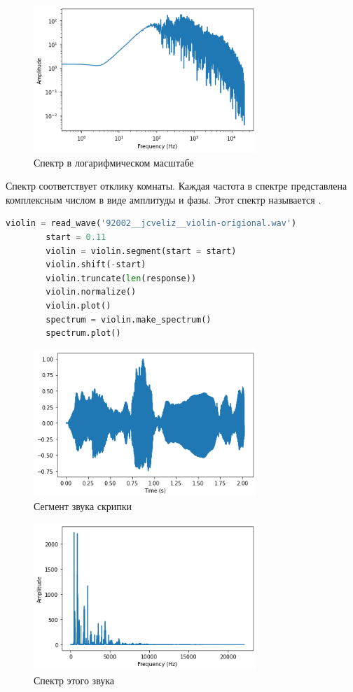 \documentclass[a4paper, 12pt]{report}
\begin{document}
	\begin{figure}[H]
		\centering
		\includegraphics[width=0.75\textwidth]{shot3.png}
		\caption{Спектр в логарифмическом масштабе}
		\label{fig:shot3}
	\end{figure}
	Спектр соответствует отклику комнаты. Каждая частота в спектре представлена комплексным числом в виде амплитуды и фазы. Этот спектр называется .
	\begin{lstlisting}[language=Python,caption=Звук скрипки]
		violin = read_wave('92002__jcveliz__violin-origional.wav')
		start = 0.11
		violin = violin.segment(start = start)
		violin.shift(-start)
		violin.truncate(len(response))
		violin.normalize()
		violin.plot()
		spectrum = violin.make_spectrum()
		spectrum.plot()
	\end{lstlisting}
	\begin{figure}[H]
		\centering
		\includegraphics[width=0.75\textwidth]{shot4.png}
		\caption{Сегмент звука скрипки}
		\label{fig:shot4}
	\end{figure}
	\begin{figure}[H]
		\centering
		\includegraphics[width=0.75\textwidth]{shot5.png}
		\caption{Спектр этого звука}
		\label{fig:shot5}
	\end{figure}
\end{document}
